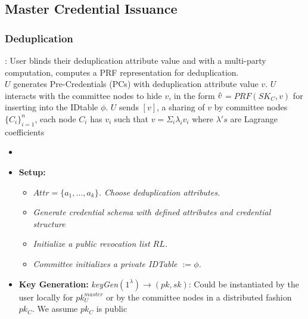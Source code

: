 \subsection{Master Credential Issuance}

\subsubsection{Deduplication}: User blinds their deduplication attribute value and with a multi-party computation, computes a PRF representation for deduplication. \\

$U$ generates Pre-Credentials (PCs) with deduplication attribute value $v$. $U$ interacts with the committee nodes to hide $v$, in the form $\mathnormal{\hat{v}}$$= PRF(SK_C,v)$ for inserting into the IDtable $\phi$. $U$ sends $[v]$, a sharing of $v$ by committee nodes $\{C_i\}^n_{i=1}$, each node $C_i$ has $v_i$ such that $v=\Sigma_i\lambda_iv_i$ where $\lambda's$ are Lagrange coefficients 

\begin{itemize}

    \item \textit{}
    
\end{itemize}







\begin{itemize}
\item \textbf{Setup:} 
       \begin{itemize}
            \item \textit{$Attr = \{a_1, \ldots, a_k\}$. Choose deduplication attributes.}
            \item \textit{Generate credential schema with defined attributes and credential structure}
            \item \textit{Initialize a public revocation list $RL$.}
            \item \textit{Committee initializes a private IDTable $:=\phi$.}
        \end{itemize}
\end{itemize}

\begin{itemize}
\item \textbf{Key Generation:} \textit{keyGen$(1^\lambda) \rightarrow (pk, sk)$}:  Could be instantiated by the user locally for $pk_U^{master}$ or by the committee nodes in a distributed fashion $pk_C$. We assume $pk_C$ is public
\end{itemize}

